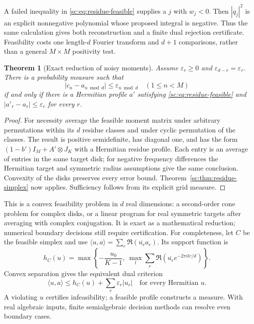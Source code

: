 \documentclass[11pt,a4paper]{article}
\newtheorem{theorem}{Theorem}[section]
\theoremstyle{definition}
\theoremstyle{remark}
\theoremstyle{plain}
\numberwithin{equation}{section}
\begin{document}
A failed inequality in \eqref{sc:eq:residue-feasible} supplies a $j$
with $w_j<0$. Then $|q_j|^2$ is an explicit nonnegative polynomial
whose proposed integral is negative. Thus the same calculation gives
both reconstruction and a finite dual rejection certificate.
Feasibility costs one length-$d$ Fourier transform and $d+1$
comparisons, rather than a general $M\times M$ positivity test.

\begin{theorem}[Exact reduction of noisy moments]\label{sc:thm:residue-noise}
Assume $\varepsilon_r\ge0$ and
$\varepsilon_{d-r}=\varepsilon_r$. There is a probability measure
such that
\[
|c_n-a_{n\bmod d}|\le\varepsilon_{n\bmod d}
\quad(1\le n<M)
\]
if and only if there is a Hermitian profile $a'$ satisfying
\eqref{sc:eq:residue-feasible} and
$|a'_r-a_r|\le\varepsilon_r$ for every $r$.
\end{theorem}
\begin{proof}
For necessity average the feasible moment matrix under arbitrary
permutations within its $d$ residue classes and under cyclic
permutation of the classes. The result is positive semidefinite,
has diagonal one, and has the form
$(1-b')I_M+A'\otimes J_K$ with a Hermitian residue profile.
Each entry is an average of entries in the same target disk; for
negative frequency differences the Hermitian target and symmetric
radius assumptions give the same conclusion. Convexity of the disks
preserves every error bound. Theorem~\ref{sc:thm:residue-simplex}
now applies. Sufficiency follows from its explicit grid measure.
\end{proof}

This is a convex feasibility problem in $d$ real dimensions: a
second-order cone problem for complex disks, or a linear program
for real symmetric targets after averaging with complex conjugation.
It is exact as a mathematical reduction; numerical boundary decisions
still require certification.
For completeness, let $C$ be the feasible simplex and use
$\langle u,a\rangle=\sum_r\Re(\overline{u_r}a_r)$.
Its support function is
\[
h_C(u)=\max\left\{-\frac{u_0}{K-1},\
\max_l\sum_r\Re(\overline{u_r}e^{-2\pi ilr/d})\right\}.
\]
Convex separation gives the equivalent dual criterion
\[
\langle u,a\rangle\le h_C(u)+\sum_r\varepsilon_r|u_r|
\quad\text{for every Hermitian }u.
\]
A violating $u$ certifies infeasibility; a feasible profile constructs
a measure. With real algebraic inputs, finite semialgebraic decision
methods can resolve even boundary cases.
\end{document}
